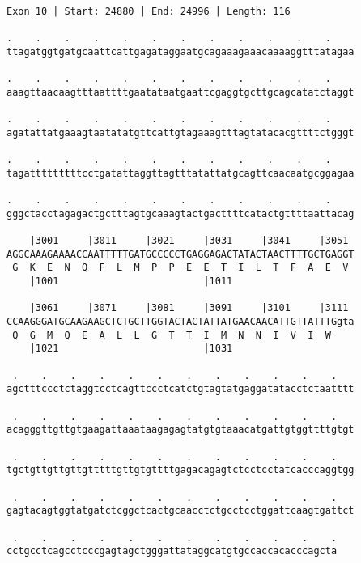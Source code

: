 \documentclass{article}
\begin{document}
\newpage
\begin{Verbatim}[fontfamily=courier]
Exon 10 | Start: 24880 | End: 24996 | Length: 116

.    .    .    .    .    .    .    .    .    .    .    .    
ttagatggtgatgcaattcattgagataggaatgcagaaagaaacaaaaggtttatagaa

.    .    .    .    .    .    .    .    .    .    .    .    
aaagttaacaagtttaattttgaatataatgaattcgaggtgcttgcagcatatctaggt

.    .    .    .    .    .    .    .    .    .    .    .    
agatattatgaaagtaatatatgttcattgtagaaagtttagtatacacgttttctgggt

.    .    .    .    .    .    .    .    .    .    .    .    
tagatttttttttcctgatattaggttagtttatattatgcagttcaacaatgcggagaa

.    .    .    .    .    .    .    .    .    .    .    .    
gggctacctagagactgctttagtgcaaagtactgacttttcatactgttttaattacag

    |3001     |3011     |3021     |3031     |3041     |3051 
AGGCAAAGAAAACCAATTTTTGATGCCCCCTGAGGAGACTATACTAACTTTTGCTGAGGT
 G  K  E  N  Q  F  L  M  P  P  E  E  T  I  L  T  F  A  E  V 
    |1001                         |1011                     

    |3061     |3071     |3081     |3091     |3101     |3111 
CCAAGGGATGCAAGAAGCTCTGCTTGGTACTACTATTATGAACAACATTGTTATTTGgta
 Q  G  M  Q  E  A  L  L  G  T  T  I  M  N  N  I  V  I  W    
    |1021                         |1031                     

 .    .    .    .    .    .    .    .    .    .    .    .   
agctttccctctaggtcctcagttccctcatctgtagtatgaggatatacctctaatttt

 .    .    .    .    .    .    .    .    .    .    .    .   
acagggttgttgtgaagattaaataagagagtatgtgtaaacatgattgtggttttgtgt

 .    .    .    .    .    .    .    .    .    .    .    .   
tgctgttgttgttgtttttgttgtgttttgagacagagtctcctcctatcacccaggtgg

 .    .    .    .    .    .    .    .    .    .    .    .   
gagtacagtggtatgatctcggctcactgcaacctctgcctcctggattcaagtgattct

 .    .    .    .    .    .    .    .    .    .    .    .
cctgcctcagcctcccgagtagctgggattataggcatgtgccaccacacccagcta
\end{Verbatim}
\newpage
\end{document}

